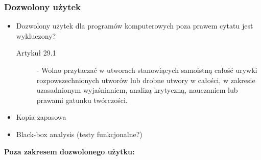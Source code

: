 \documentclass[12pt,a4paper]{article}
\begin{document}
\subsubsection{Dozwolony użytek}
\begin{itemize}
\item Dozwolony użytek dla programów komputerowych poza prawem cytatu jest wykluczony?
	\begin{description}
		\item [Artykuł 29.1] - Wolno przytaczać w utworach stanowiących samoistną całość urywki rozpowszechnionych utworów lub drobne utwory w całości, w zakresie uzasadnionym wyjaśnianiem, analizą krytyczną, nauczaniem lub prawami gatunku twórczości.
	\end{description}
\item Kopia zapasowa
\item Black-box analysis (testy funkcjonalne?)
\end{itemize}
\textbf{Poza zakresem dozwolonego użytku:}
\end{document}
